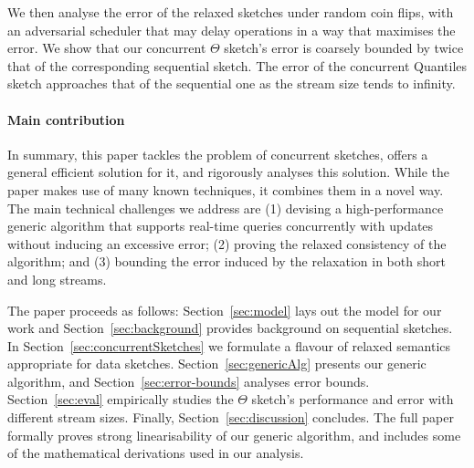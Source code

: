 We then analyse the error of the relaxed sketches under random coin flips, with an adversarial scheduler that may delay operations in a
way that maximises the error. We show that our concurrent $\Theta$ sketch's error is coarsely bounded by twice
that of the corresponding sequential sketch. The error of the concurrent Quantiles sketch approaches
that of the sequential one as the stream size tends to infinity.

\vspace{-5pt}
\paragraph{Main contribution} In summary, this paper tackles the problem of concurrent sketches,
offers a general efficient solution for it, and rigorously analyses this solution. While the
paper makes use of many known techniques, it combines them in a novel way.
The main technical challenges we address are (1) devising a high-performance generic algorithm 
that supports real-time queries concurrently with updates without inducing an excessive error; 
(2) proving the relaxed consistency of the algorithm; 
and (3) bounding the error induced by the relaxation in both short and long streams.

The paper proceeds as follows:
Section~\ref{sec:model} lays out the model for our work and Section~\ref{sec:background} provides background
on sequential sketches. In Section~\ref{sec:concurrentSketches} we formulate a flavour of relaxed semantics
appropriate for data sketches. Section~\ref{sec:genericAlg} presents our generic algorithm, and
Section~\ref{sec:error-bounds} analyses error bounds. Section~\ref{sec:eval} empirically studies the $\Theta$ sketch's performance
and error with different stream sizes. Finally, Section~\ref{sec:discussion}
concludes. The full paper~\cite{rinberg2019fast}
formally proves strong linearisability of our generic algorithm, and
includes some of the mathematical derivations used in our analysis.
